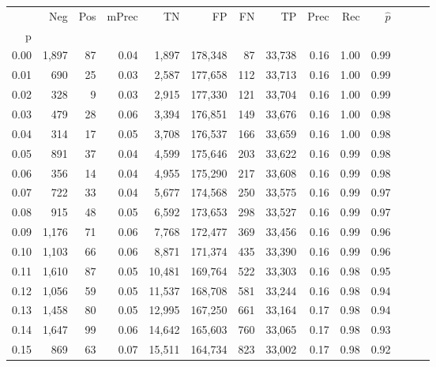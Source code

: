 \begin{tabular}{rrrrrrrrrrrrrr}
\toprule
{} &    Neg &  Pos & mPrec &       TN &       FP &      FN &      TP &  Prec &   Rec & $\hat{p}$ \\
p    &        &      &       &          &          &         &         &       &       &           \\
\midrule
0.00 &  1,897 &   87 &  0.04 &    1,897 &  178,348 &      87 &  33,738 &  0.16 &  1.00 &      0.99 \\
0.01 &    690 &   25 &  0.03 &    2,587 &  177,658 &     112 &  33,713 &  0.16 &  1.00 &      0.99 \\
0.02 &    328 &    9 &  0.03 &    2,915 &  177,330 &     121 &  33,704 &  0.16 &  1.00 &      0.99 \\
0.03 &    479 &   28 &  0.06 &    3,394 &  176,851 &     149 &  33,676 &  0.16 &  1.00 &      0.98 \\
0.04 &    314 &   17 &  0.05 &    3,708 &  176,537 &     166 &  33,659 &  0.16 &  1.00 &      0.98 \\
0.05 &    891 &   37 &  0.04 &    4,599 &  175,646 &     203 &  33,622 &  0.16 &  0.99 &      0.98 \\
0.06 &    356 &   14 &  0.04 &    4,955 &  175,290 &     217 &  33,608 &  0.16 &  0.99 &      0.98 \\
0.07 &    722 &   33 &  0.04 &    5,677 &  174,568 &     250 &  33,575 &  0.16 &  0.99 &      0.97 \\
0.08 &    915 &   48 &  0.05 &    6,592 &  173,653 &     298 &  33,527 &  0.16 &  0.99 &      0.97 \\
0.09 &  1,176 &   71 &  0.06 &    7,768 &  172,477 &     369 &  33,456 &  0.16 &  0.99 &      0.96 \\
0.10 &  1,103 &   66 &  0.06 &    8,871 &  171,374 &     435 &  33,390 &  0.16 &  0.99 &      0.96 \\
0.11 &  1,610 &   87 &  0.05 &   10,481 &  169,764 &     522 &  33,303 &  0.16 &  0.98 &      0.95 \\
0.12 &  1,056 &   59 &  0.05 &   11,537 &  168,708 &     581 &  33,244 &  0.16 &  0.98 &      0.94 \\
0.13 &  1,458 &   80 &  0.05 &   12,995 &  167,250 &     661 &  33,164 &  0.17 &  0.98 &      0.94 \\
0.14 &  1,647 &   99 &  0.06 &   14,642 &  165,603 &     760 &  33,065 &  0.17 &  0.98 &      0.93 \\
0.15 &    869 &   63 &  0.07 &   15,511 &  164,734 &     823 &  33,002 &  0.17 &  0.98 &      0.92 \\

\end{tabular}

